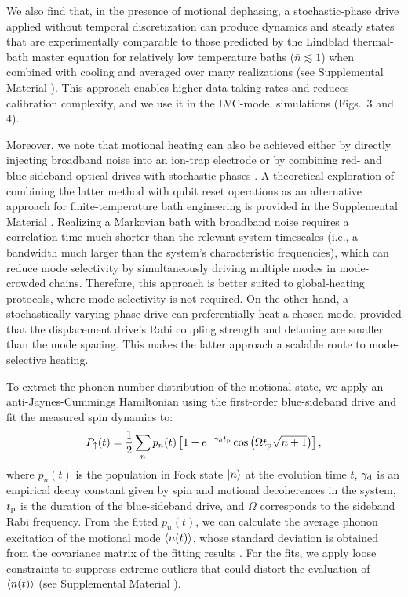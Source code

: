 \documentclass[
reprint,
superscriptaddress,

amsmath,amssymb,
aps,
prl,

floatfix,
]{revtex4-2}
\begin{document}
We also find that, in the presence of motional dephasing, a stochastic-phase drive applied without temporal discretization can produce dynamics and steady states that are experimentally comparable to those predicted by the Lindblad thermal-bath master equation for relatively low temperature baths ($\bar{n}\lesssim 1$) when combined with cooling and averaged over many realizations (see Supplemental Material \cite{so2025fT_supp}). This approach enables higher data-taking rates and reduces calibration complexity, and we use it in the LVC-model simulations (Figs.~3 and 4).

Moreover, we note that motional heating can also be achieved either by directly injecting broadband noise into an ion-trap electrode \cite{myatt2000decoherence,navickas2025chemical} or by combining red- and blue-sideband optical drives with stochastic phases \cite{sun2025quantum,olaya-agudelo2025open}. A theoretical exploration of combining the latter method with qubit reset operations as an alternative approach for finite-temperature bath engineering is provided in the Supplemental Material \cite{so2025fT_supp}. Realizing a Markovian bath with broadband noise requires a correlation time much shorter than the relevant system timescales (i.e., a bandwidth much larger than the system’s characteristic frequencies), which can reduce mode selectivity by simultaneously driving multiple modes in mode-crowded chains. Therefore, this approach is better suited to global-heating protocols, where mode selectivity is not required. On the other hand, a stochastically varying-phase drive can preferentially heat a chosen mode, provided that the displacement drive’s Rabi coupling strength and detuning are smaller than the mode spacing. This makes the latter approach a scalable route to mode-selective heating.

To extract the phonon-number distribution of the motional state, we apply an anti-Jaynes-Cummings Hamiltonian using the first-order blue-sideband drive and fit the measured spin dynamics to:
\begin{equation}
    P_{\uparrow} (t)=\frac{1}{2}\sum_n p_n(t)\left[1-e^{-\gamma_{\rm d} t_{\rm p}}\cos{\left(\Omega t_{\rm p}\sqrt{n+1}\right)}\right],
    \label{eq_phonmeasure}
\end{equation}
where $p_n(t)$ is the population in Fock state $\ket{n}$ at the evolution time $t$, $\gamma_{\rm d}$ is an empirical decay constant given by spin and motional decoherences in the system, $t_{\rm p}$ is the duration of the blue-sideband drive, and $\Omega$ corresponds to the sideband Rabi frequency. From the fitted $p_n(t)$, we can calculate the average phonon excitation of the motional mode $\braket{n(t)}$, whose standard deviation is obtained from the covariance matrix of the fitting results \cite{cai2021rabi}. For the fits, we apply loose constraints to suppress extreme outliers that could distort the evaluation of $\braket{n(t)}$ (see Supplemental Material \cite{so2025fT_supp}).
\end{document}

